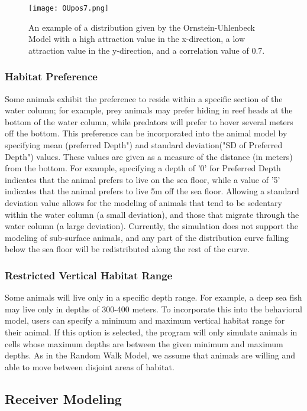 \begin{figure}[ht]
	\label{OUimg}
	\centering
	\texttt{[image: OUpos7.png]}
	\caption{An example of a distribution given by the Ornstein-Uhlenbeck Model with a high attraction value in the x-direction, a low attraction value in the y-direction, and a correlation value of 0.7.}
\end{figure}


\subsubsection{Habitat Preference}
\label{habitatPref}
Some animals exhibit the preference to reside within a specific section of the water column; for example, prey animals may prefer hiding in reef heads at the bottom of the water column, while predators will prefer to hover several meters off the bottom.  This preference can be incorporated into the animal model by specifying mean (preferred Depth") and standard deviation("SD of Preferred Depth") values.  These values are given as a measure of the distance (in meters) from the bottom.  For example, specifying a depth of '0' for Preferred Depth indicates that the animal prefers to live on the sea floor, while a value of '5' indicates that the animal prefers to live 5m off the sea floor.  Allowing a standard deviation value allows for the modeling of animals that tend to be sedentary within the water column (a small deviation), and those that migrate through the water column (a large deviation).  Currently, the simulation does not support the modeling of sub-surface animals, and any part of the distribution curve falling below the sea floor will be redistributed along the rest of the curve. 


\subsubsection{Restricted Vertical Habitat Range}
\label{restrictedVerticalHabitat}
Some animals will live only in a specific depth range.  For example, a deep sea fish may live only in depths of 300-400 meters.  To incorporate this into the behavioral model, users can specify a minimum and maximum vertical habitat range for their animal.  If this option is selected, the program will only simulate animals in cells whose maximum depths are between the given minimum and maximum depths.  As in the Random Walk Model, we assume that animals are willing and able to move between disjoint areas of habitat.


\subsection{Receiver Modeling}
\label{receiverModel}

